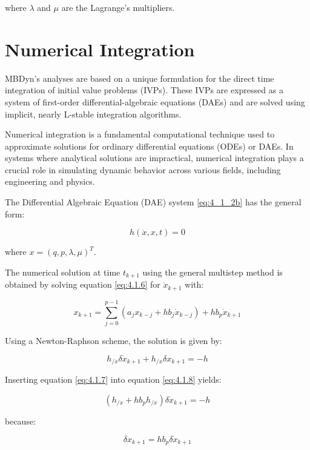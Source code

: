 where \( \lambda \) and \( \mu \) are the Lagrange’s multipliers.

\section{Numerical Integration}
MBDyn's analyses are based on a unique formulation for the direct time integration of initial value problems (IVPs). These IVPs are expressed as a system of first-order differential-algebraic equations (DAEs) and are solved using implicit, nearly L-stable integration algorithms.

Numerical integration is a fundamental computational technique used to approximate solutions for ordinary differential equations (ODEs) or DAEs. In systems where analytical solutions are impractical, numerical integration plays a crucial role in simulating dynamic behavior across various fields, including engineering and physics.

The Differential Algebraic Equation (DAE) system \ref{eq:4_1_2b} has the general form:

\begin{equation}
    h(\dot{x}, x, t) = 0 \label{eq:4.1.6}
\end{equation}

where \( x = (q, p, \lambda, \mu)^T \).

The numerical solution at time \( t_{k+1} \) using the general multistep method is obtained by solving equation \ref{eq:4.1.6} for \( \dot{x}_{k+1} \) with:

\begin{equation}
    x_{k+1} = \sum_{j=0}^{p-1} (a_j x_{k-j} + h b_j \dot{x}_{k-j}) + h b_p \dot{x}_{k+1} \label{eq:4.1.7}
\end{equation}

Using a Newton-Raphson scheme, the solution is given by:

\begin{equation}
    h_{/\dot{x}} \delta \dot{x}_{k+1} + h_{/ x} \delta x_{k+1} = -h  \label{eq:4.1.8}
\end{equation}

Inserting equation \ref{eq:4.1.7} into equation \ref{eq:4.1.8} yields:

\begin{equation}
    \left(h_{/ \dot{x}} + h b_p h_{/ x}\right) \delta \dot{x}_{k+1} = -h \label{eq:4.1.9}
\end{equation}

because:

\begin{equation}
    \delta x_{k+1} = h b_p \delta \dot{x}_{k+1} \label{eq:4.1.10}
\end{equation}

